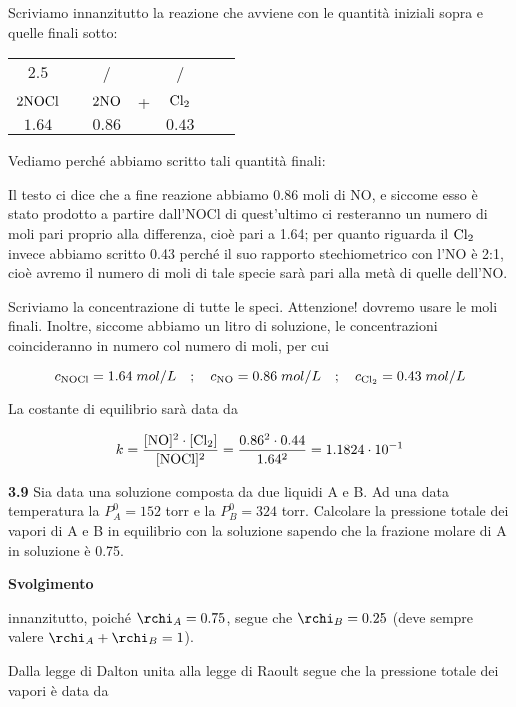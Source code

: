 \vspace{0.2cm}Scriviamo innanzitutto la reazione che avviene con le quantità iniziali sopra e quelle finali sotto: 

\begin{center}
    \begin{tabular}{ccccccc}
        $2.5$ & & / & & /\\
        $\rm 2NOCl$ & \ce{<-->} & $\rm 2NO$ & + & $\rm Cl_2$\\
        $1.64$ & & $0.86$ & & $0.43$\\
    \end{tabular}
\end{center}

Vediamo perché abbiamo scritto tali quantità finali:

Il testo ci dice che a fine reazione abbiamo 0.86 moli di NO, e siccome esso è stato prodotto a partire dall'NOCl di quest'ultimo ci resteranno un numero di moli pari proprio alla differenza, cioè pari a 1.64; per quanto riguarda il $\rm Cl_2$ invece abbiamo scritto 0.43 perché il suo rapporto stechiometrico con l'NO è 2:1, cioè avremo il numero di moli di tale specie sarà pari alla metà di quelle dell'NO.

Scriviamo la concentrazione di tutte le speci. Attenzione! dovremo usare le moli finali. Inoltre, siccome abbiamo un litro di soluzione, le concentrazioni coincideranno in numero col numero di moli, per cui

$$c_{\rm NOCl}=1.64\;mol/L
\quad;\quad
c_{\rm NO}=0.86\;mol/L
\quad;\quad
c_{\rm Cl_2}=0.43\;mol/L$$

La costante di equilibrio sarà data da

$$k=\rm \frac{[NO]^2 \cdot [Cl_2]}{[NOCl]^2}
=\frac{0.86^2 \cdot 0.44}{1.64^2}=1.1824 \cdot 10^{-1}$$

\vspace{0.2cm}\textbf{3.9} Sia data una soluzione composta da due liquidi A e B. Ad una data temperatura la $P^0_A = 152$ torr
e la $P^0_B = 324$ torr. Calcolare la pressione totale dei vapori di A e B in equilibrio con la soluzione sapendo che la frazione molare di A in soluzione è 0.75.

\vspace{0.2cm}\large\textbf{Svolgimento}\normalsize

\vspace{0.2cm}innanzitutto, poiché $\rchi_A=0.75$, segue che $\rchi_B=0.25$ (deve sempre valere $\rchi_A + \rchi_B =1$).

Dalla legge di Dalton unita alla legge di Raoult segue che la pressione totale dei vapori è data da

